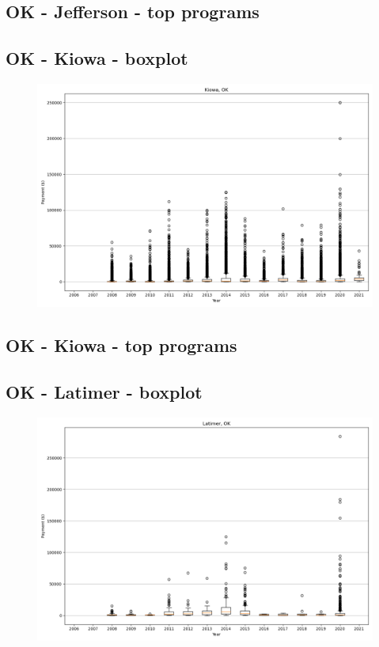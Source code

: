 \subsection*{OK - Jefferson - top programs}

\newpage
\subsection*{OK - Kiowa - boxplot}
\begin{figure}[h]
\centering
\includegraphics[width=7in]{../output/boxplots/counties/Kiowa-OK_boxplot.png}
\end{figure}


\subsection*{OK - Kiowa - top programs}

\newpage
\subsection*{OK - Latimer - boxplot}
\begin{figure}[h]
\centering
\includegraphics[width=7in]{../output/boxplots/counties/Latimer-OK_boxplot.png}
\end{figure}



